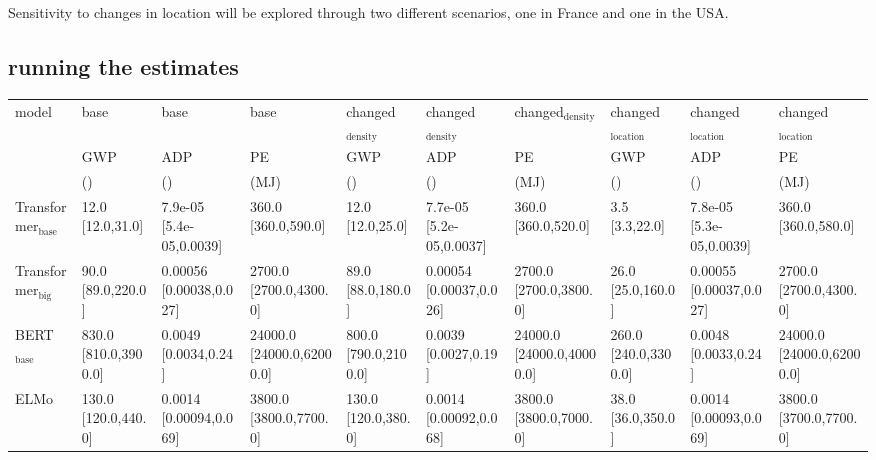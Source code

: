 \documentclass[11pt]{article}
\begin{document}
Sensitivity to changes in location will be explored through two
different scenarios, one in France and one in the USA.

\subsection{running the estimates}
\label{sec:orgb1c6e0b}

\begin{center}
\begin{tabular}{llllllllll}
model & base & base & base & changed\(_{\text{density}}\) & changed\(_{\text{density}}\) & changed\(_{\text{density}}\) & changed\(_{\text{location}}\) & changed\(_{\text{location}}\) & changed\(_{\text{location}}\)\\
 & GWP & ADP & PE & GWP & ADP & PE & GWP & ADP & PE\\
 & (\COtwo{}) & (\Sbe{}) & (MJ) & (\COtwo{}) & (\Sbe{}) & (MJ) & (\COtwo{}) & (\Sbe{}) & (MJ)\\
\hline
Transformer\(_{\text{base}}\) & 12.0 [12.0,31.0] & 7.9e-05 [5.4e-05,0.0039] & 360.0 [360.0,590.0] & 12.0 [12.0,25.0] & 7.7e-05 [5.2e-05,0.0037] & 360.0 [360.0,520.0] & 3.5 [3.3,22.0] & 7.8e-05 [5.3e-05,0.0039] & 360.0 [360.0,580.0]\\
Transformer\(_{\text{big}}\) & 90.0 [89.0,220.0] & 0.00056 [0.00038,0.027] & 2700.0 [2700.0,4300.0] & 89.0 [88.0,180.0] & 0.00054 [0.00037,0.026] & 2700.0 [2700.0,3800.0] & 26.0 [25.0,160.0] & 0.00055 [0.00037,0.027] & 2700.0 [2700.0,4300.0]\\
BERT\(_{\text{base}}\) & 830.0 [810.0,3900.0] & 0.0049 [0.0034,0.24] & 24000.0 [24000.0,62000.0] & 800.0 [790.0,2100.0] & 0.0039 [0.0027,0.19] & 24000.0 [24000.0,40000.0] & 260.0 [240.0,3300.0] & 0.0048 [0.0033,0.24] & 24000.0 [24000.0,62000.0]\\
ELMo & 130.0 [120.0,440.0] & 0.0014 [0.00094,0.069] & 3800.0 [3800.0,7700.0] & 130.0 [120.0,380.0] & 0.0014 [0.00092,0.068] & 3800.0 [3800.0,7000.0] & 38.0 [36.0,350.0] & 0.0014 [0.00093,0.069] & 3800.0 [3700.0,7700.0]\\
\end{tabular}
\end{center}
\end{document}

